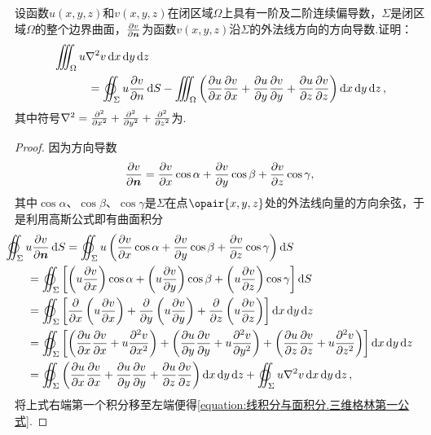\begin{example}[三维格林第一公式]
设函数\(u(x,y,z)\)和\(v(x,y,z)\)在闭区域\(\Omega\)上具有一阶及二阶连续偏导数，\(\Sigma\)是闭区域\(\Omega\)的整个边界曲面，\(\pdv{v}{\boldsymbol{n}}\)为函数\(v(x,y,z)\)沿\(\Sigma\)的外法线方向的方向导数.证明：
\begin{equation}\label{equation:线积分与面积分.三维格林第一公式}
\begin{split}
&\iiint_{\Omega} u \laplacian{v} \dd{x}\dd{y}\dd{z} \\
&\hspace{30pt}=\varoiint_{\Sigma} u \pdv{v}{n} \dd{S}
-\iiint_{\Omega} \left(
\pdv{u}{x} \pdv{v}{x}
+\pdv{u}{y} \pdv{v}{y}
+\pdv{u}{z} \pdv{v}{z}
\right) \dd{x}\dd{y}\dd{z},
\end{split}
\end{equation}其中符号\(\laplacian = \pdv[2]{x} + \pdv[2]{y} + \pdv[2]{z}\)为.
\begin{proof}
因为方向导数\[
\pdv{v}{\boldsymbol{n}}
= \pdv{v}{x} \cos\alpha
+ \pdv{v}{y} \cos\beta
+ \pdv{v}{z} \cos\gamma,
\]其中\(\cos\alpha\)、\(\cos\beta\)、\(\cos\gamma\)是\(\Sigma\)在点\(\opair{x,y,z}\)处的外法线向量的方向余弦，于是利用高斯公式即有曲面积分\begin{align*}
&\hspace{-20pt}\varoiint_{\Sigma} u \pdv{v}{\mat{n}} \dd{S}
= \varoiint_{\Sigma} u \left(
\pdv{v}{x} \cos\alpha
+ \pdv{v}{y} \cos\beta
+ \pdv{v}{z} \cos\gamma
\right) \dd{S} \\
&= \varoiint_{\Sigma} \left[
\left( u \pdv{v}{x} \right) \cos\alpha
+ \left( u \pdv{v}{y} \right) \cos\beta
+ \left( u \pdv{v}{z} \right) \cos\gamma
\right] \dd{S} \\
&= \varoiint_{\Sigma} \left[
\pdv{x} \left( u \pdv{v}{x} \right)
+ \pdv{y} \left( u \pdv{v}{y} \right)
+ \pdv{z} \left( u \pdv{v}{z} \right)
\right] \dd{x}\dd{y}\dd{z} \\
&= \varoiint_{\Sigma} \left[
\left( \pdv{u}{x} \pdv{v}{x} + u \pdv[2]{v}{x} \right)
+ \left( \pdv{u}{y} \pdv{v}{y} + u \pdv[2]{v}{y} \right)
+ \left( \pdv{u}{z} \pdv{v}{z} + u \pdv[2]{v}{z} \right)
\right] \dd{x}\dd{y}\dd{z} \\
&= \varoiint_{\Sigma} \left(
\pdv{u}{x} \pdv{v}{x}
+ \pdv{u}{y} \pdv{v}{y}
+ \pdv{u}{z} \pdv{v}{z}
\right) \dd{x}\dd{y}\dd{z}
+ \varoiint_{\Sigma} u \laplacian{v} \dd{x}\dd{y}\dd{z},
\end{align*}将上式右端第一个积分移至左端便得\cref{equation:线积分与面积分.三维格林第一公式}.
\end{proof}
\end{example}

